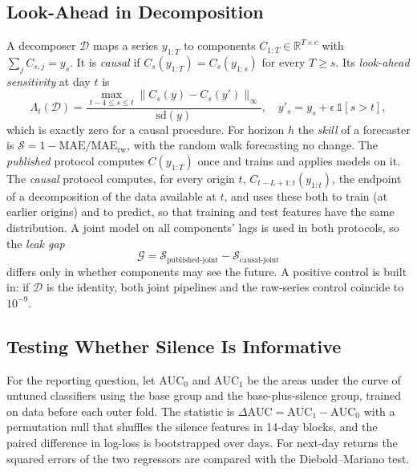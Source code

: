 \documentclass{ieeeaccess}
\begin{document}
\subsection{Look-Ahead in Decomposition}
A decomposer $\mathcal D$ maps a series $y_{1:T}$ to components $C_{1:T}\in\mathbb R^{T\times c}$ with $\sum_jC_{s,j}=y_s$. It is \emph{causal} if $C_s(y_{1:T})=C_s(y_{1:s})$ for every $T\ge s$. Its \emph{look-ahead sensitivity} at day $t$ is
\begin{equation}
\Lambda_t(\mathcal D)=\frac{\max_{t-4\le s\le t}\bigl\|C_s(y)-C_s(y')\bigr\|_\infty}{\mathrm{sd}(y)},\quad y'_s=y_s+\epsilon\,\mathbb 1[s>t],
\end{equation}
which is exactly zero for a causal procedure. For horizon $h$ the \emph{skill} of a forecaster is $\mathcal S=1-\mathrm{MAE}/\mathrm{MAE}_{\mathrm{rw}}$, with the random walk forecasting no change. The \emph{published} protocol computes $C(y_{1:T})$ once and trains and applies models on it. The \emph{causal} protocol computes, for every origin $t$, $C_{t-L+1:t}(y_{1:t})$, the endpoint of a decomposition of the data available at $t$, and uses these both to train (at earlier origins) and to predict, so that training and test features have the same distribution. A joint model on all components' lags is used in both protocols, so the \emph{leak gap}
\begin{equation}
\mathcal G=\mathcal S_{\text{published-joint}}-\mathcal S_{\text{causal-joint}}
\end{equation}
differs only in whether components may see the future. A positive control is built in: if $\mathcal D$ is the identity, both joint pipelines and the raw-series control coincide to $10^{-9}$.

\subsection{Testing Whether Silence Is Informative}
For the reporting question, let $\mathrm{AUC}_0$ and $\mathrm{AUC}_1$ be the areas under the curve of untuned classifiers using the base group and the base-plus-silence group, trained on data before each outer fold. The statistic is $\Delta\mathrm{AUC}=\mathrm{AUC}_1-\mathrm{AUC}_0$ with a permutation null that shuffles the silence features in 14-day blocks, and the paired difference in log-loss is bootstrapped over days. For next-day returns the squared errors of the two regressors are compared with the Diebold--Mariano test.
\end{document}
